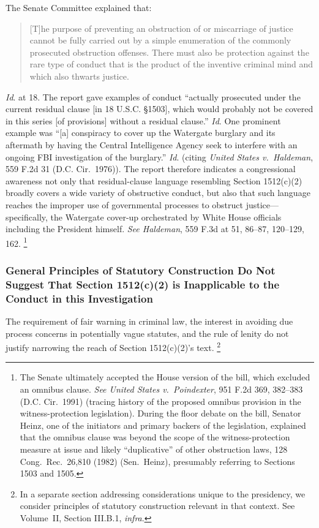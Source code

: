The Senate Committee explained that:

\begin{quote}
[T]he purpose of preventing an obstruction of or miscarriage of justice cannot be fully carried out by a simple enumeration of the commonly prosecuted obstruction offenses.
There must also be protection against the rare type of conduct that is the product of the inventive criminal mind and which also thwarts justice.
\end{quote}

\textit{Id}. at 18.
The report gave examples of conduct “actually prosecuted under the current residual clause [in 18 U.S.C. \S 1503], which would probably not be covered in this series [of provisions] without a residual clause.”
\textit{Id}.
One prominent example was “[a] conspiracy to cover up the Watergate burglary and its aftermath by having the Central Intelligence Agency seek to interfere with an ongoing FBI investigation of the burglary.”
\textit{Id}. (citing \textit{United States v.\ Haldeman}, 559 F.2d 31 (D.C. Cir.~1976)).
The report therefore indicates a congressional awareness not only that residual-clause language resembling Section 1512(c)(2) broadly covers a wide variety of obstructive conduct, but also that such language reaches the improper use of governmental processes to obstruct justice---specifically, the Watergate cover-up orchestrated by White House officials including the President himself.
\textit{See Haldeman}, 559 F.3d at 51, 86--87, 120--129, 162.%
\footnote{The Senate ultimately accepted the House version of the bill, which excluded an omnibus clause.
\textit{See United States v.\ Poindexter}, 951 F.2d 369, 382--383 (D.C. Cir.~1991) (tracing history of the proposed omnibus provision in the witness-protection legislation).
During the floor debate on the bill, Senator Heinz, one of the initiators and primary backers of the legislation, explained that the omnibus clause was beyond the scope of the witness-protection measure at issue and likely “duplicative” of other obstruction laws, 128 Cong.\ Rec.\ 26,810 (1982) (Sen.~Heinz), presumably referring to Sections 1503 and 1505.}

\subsubsection{General Principles of Statutory Construction Do Not Suggest That Section 1512(c)(2) is Inapplicable to the Conduct in this Investigation}

The requirement of fair warning in criminal law, the interest in avoiding due process concerns in potentially vague statutes, and the rule of lenity do not justify narrowing the reach of Section 1512(c)(2)’s text.%
\footnote{In a separate section addressing considerations unique to the presidency, we consider principles of statutory construction relevant in that context.
See Volume~II, Section III.B.1, \textit{infra}.}

